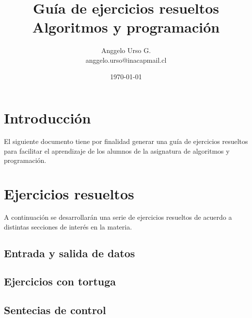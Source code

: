 \documentclass[]{"article"}
\title{Guía de ejercicios resueltos \protect\\ Algoritmos y programación}
\author{Anggelo Urso G. \\ anggelo.urso@inacapmail.cl}
\date{\today}
\begin{document}
    \thispagestyle{empty}
    \maketitle

    \section{Introducción}
    
    El siguiente documento tiene por finalidad generar una guía de ejercicios resueltos para facilitar el aprendizaje de los alumnos de la asignatura de algoritmos y programación.

    \section{Ejercicios resueltos}

    A continuación se desarrollarán una serie de ejercicios resueltos de acuerdo a distintas secciones de interés en la materia.

    \subsection{Entrada y salida de datos}
    

    \subsection{Ejercicios con tortuga}
    

    \subsection{Sentecias de control}
    
\end{document}
